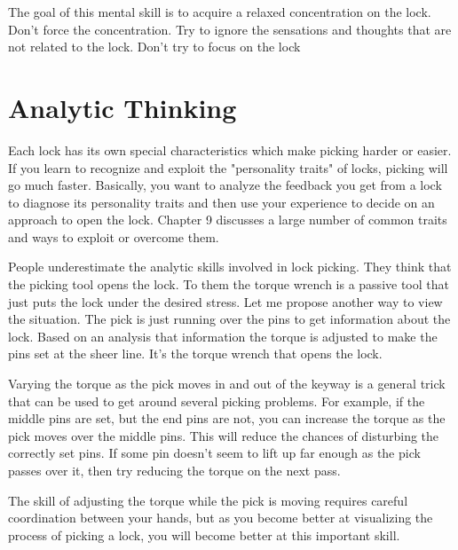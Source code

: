 The goal of this mental skill is to acquire a relaxed concentration on the lock. Don't
force the concentration. Try to ignore the sensations and thoughts that are not related to
the lock. Don't try to focus on the lock

\section{Analytic Thinking}
Each lock has its own special characteristics which make picking harder or easier. If you
learn to recognize and exploit the "personality traits" of locks, picking will go much faster.
Basically, you want to analyze the feedback you get from a lock to diagnose its personality
traits and then use your experience to decide on an approach to open the lock. Chapter 9
discusses a large number of common traits and ways to exploit or overcome them.

People underestimate the analytic skills involved in lock picking. They think that the
picking tool opens the lock. To them the torque wrench is a passive tool that just puts the
lock under the desired stress. Let me propose another way to view the situation. The pick
is just running over the pins to get information about the lock. Based on an analysis that
information the torque is adjusted to make the pins set at the sheer line. It's the torque
wrench that opens the lock.

Varying the torque as the pick moves in and out of the keyway is a general trick that can
be used to get around several picking problems. For example, if the middle pins are set, but
the end pins are not, you can increase the torque as the pick moves over the middle pins.
This will reduce the chances of disturbing the correctly set pins. If some pin doesn't seem to
lift up far enough as the pick passes over it, then try reducing the torque on the next pass.

The skill of adjusting the torque while the pick is moving requires careful coordination
between your hands, but as you become better at visualizing the process of picking a lock,
you will become better at this important skill.
